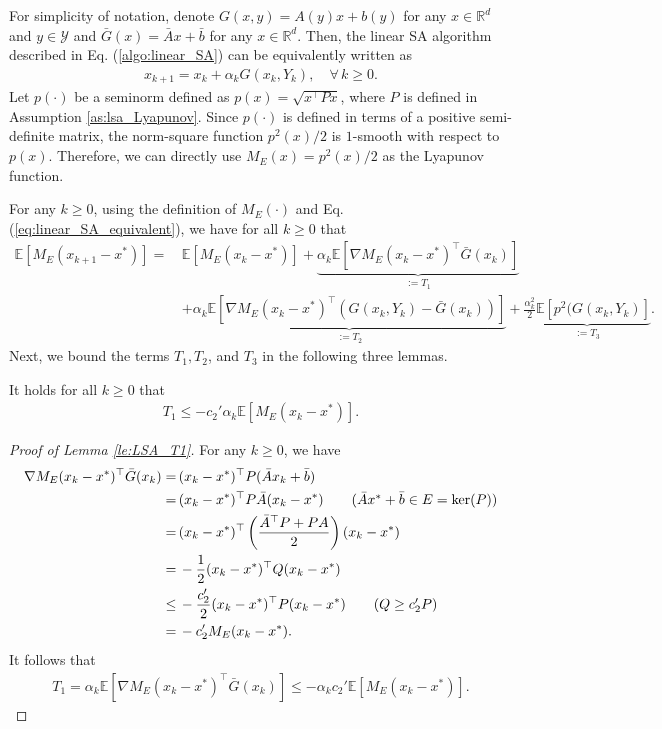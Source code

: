 \documentclass[11 pt]{article}
\begin{document}
	For simplicity of notation, denote $G(x,y)=A(y)x+b(y)$ for any $x\in\mathbb{R}^d$ and $y\in\mathcal{Y}$ and $\bar{G}(x)=\bar{A}x+\bar{b}$ for any $x\in\mathbb{R}^d$. Then, the linear SA algorithm described in Eq. (\ref{algo:linear_SA}) can be equivalently written as
	\begin{align}\label{eq:linear_SA_equivalent}
		x_{k+1}=x_k+\alpha_k G(x_k,Y_k),\quad \forall\,k\geq 0.
	\end{align}
	Let $p(\cdot)$ be a seminorm defined as $p(x)=\sqrt{x^\top Px}$, where $P$ is defined in Assumption \ref{as:lsa_Lyapunov}. Since $p(\cdot)$ is defined in terms of a positive semi-definite matrix, the norm-square function $p^2(x)/2$ is $1$-smooth with respect to $p(x)$. Therefore, we can directly use $M_E(x)=p^2(x)/2$ as the Lyapunov function. 
	
	For any $k\geq 0$, using the definition of $M_E(\cdot)$ and Eq. (\ref{eq:linear_SA_equivalent}), we have for all $k\geq 0$ that
	\begin{align}\label{eq:Thm:lsa_proof_decomposition}
		\mathbb{E}[M_E(x_{k+1}-x^*)]=\,&\mathbb{E}[M_E(x_k-x^*)]+\underbrace{\alpha_k\mathbb{E}[\nabla M_E(x_k-x^*)^\top \bar{G}(x_k)]}_{:=T_1}\nonumber\\
		&+\underbrace{\alpha_k\mathbb{E}[\nabla M_E(x_k-x^*)^\top (G(x_k,Y_k)-\bar{G}(x_k))]}_{:=T_2}+\underbrace{\frac{\alpha_k^2}{2}\mathbb{E}[p^2(G(x_k,Y_k)]}_{:=T_3}.
	\end{align}
	Next, we bound the terms $T_1, T_2$, and $T_3$ in the following three lemmas.
	\begin{lemma}\label{le:LSA_T1}
		It holds for all $k\geq 0$ that
		\begin{align*}
			T_1 \leq -c_2'\alpha_k\mathbb{E}[M_E(x_k-x^*)].
		\end{align*}
	\end{lemma}
	\begin{proof}[Proof of Lemma \ref{le:LSA_T1}] For any $k\geq 0$, we have
		\begin{align*}
			\nabla M_E(x_k-x^*)^\top \bar{G}(x_k)
			=\,& (x_k-x^*)^\top P (\bar{A}x_k+\bar{b})\\
			=\,& (x_k-x^*)^\top P \bar{A}(x_k-x^*)\tag{$\bar{A}x^*+\bar{b}\in E=\text{ker}(P)$}\\
			=\,& (x_k-x^*)^\top \left(\frac{\bar{A}^\top P+PA}{2}\right)(x_k-x^*)\\
			=\,&-\frac{1}{2} (x_k-x^*)^\top Q(x_k-x^*)\\
			\leq \,&-\frac{c_2'}{2}(x_k-x^*)^\top P(x_k-x^*)\tag{$Q\geq c_2'P$}\\
			= \,&-c_2'M_E(x_k-x^*).
		\end{align*}
		It follows that 
		\begin{align*}
			T_1=\alpha_k\mathbb{E}[\nabla M_E(x_k-x^*)^\top \bar{G}(x_k)]\leq -\alpha_k c_2'\mathbb{E}[M_E(x_k-x^*)].
		\end{align*}
	\end{proof}
	
\end{document}
